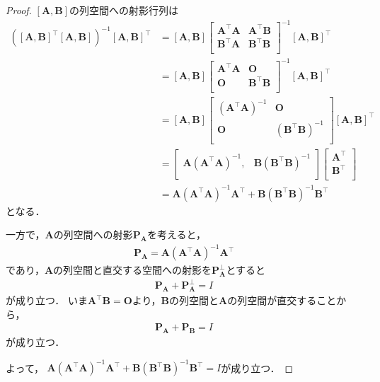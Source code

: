 \documentclass[dvipdfmx,10pt, a4j]{jarticle}
\theoremstyle{definition}
\begin{document}
\begin{proof}
$[\bm{A},\bm{B}]$の列空間への射影行列は
\begin{align*}
    [\bm{A},\bm{B}]([\bm{A},\bm{B}]^{\top}[\bm{A},\bm{B}])^{-1}[\bm{A},\bm{B}]^{\top}
    &=
    [\bm{A},\bm{B}]
    \begin{bmatrix}
        \bm{A}^{\top}\bm{A} & \bm{A}^{\top}\bm{B} \\
        \bm{B}^{\top}\bm{A} & \bm{B}^{\top}\bm{B} \\
    \end{bmatrix}^{-1}
    [\bm{A},\bm{B}]^{\top}
    \\
    &=
    [\bm{A},\bm{B}]
    \begin{bmatrix}
        \bm{A}^{\top}\bm{A} & \bm{O} \\
        \bm{O} & \bm{B}^{\top}\bm{B} \\
    \end{bmatrix}^{-1}
    [\bm{A},\bm{B}]^{\top}
    \\
    &=
    [\bm{A},\bm{B}]
    \begin{bmatrix}
        (\bm{A}^{\top}\bm{A})^{-1} & \bm{O} \\
        \bm{O} & (\bm{B}^{\top}\bm{B})^{-1} \\
    \end{bmatrix}
    [\bm{A},\bm{B}]^{\top}
    \\
    &=
    \begin{bmatrix}
        \bm{A}(\bm{A}^{\top}\bm{A})^{-1} ,&
        \bm{B}(\bm{B}^{\top}\bm{B})^{-1} \\
    \end{bmatrix}
    \begin{bmatrix}
        \bm{A}^{\top} \\
        \bm{B}^{\top} \\
    \end{bmatrix}
    \\
    &= \bm{A}(\bm{A}^{\top}\bm{A})^{-1}\bm{A}^{\top} + \bm{B}(\bm{B}^{\top}\bm{B})^{-1}\bm{B}^{\top}
\end{align*}
となる．

一方で，$\bm{A}$の列空間への射影$\bm{\bm{P}}_{\bm{A}}$を考えると，
\begin{align*}
    \bm{P}_{\bm{A}} = \bm{A}(\bm{A}^{\top}\bm{A})^{-1}\bm{A}^{\top}
\end{align*}
であり，$\bm{A}$の列空間と直交する空間への射影を$\bm{P}^{\bot}_{\bm{A}}$とすると
\begin{align*}
    \bm{P}_{\bm{A}} + \bm{P}^{\bot}_{\bm{A}} = I
\end{align*}
が成り立つ．
いま$\bm{A}^{\top}\bm{B}=\bm{O}$より，$\bm{B}$の列空間と$\bm{A}$の列空間が直交することから，
\begin{align*}
    \bm{P}_{\bm{A}} + \bm{P}_{\bm{B}} = I
\end{align*}
が成り立つ．

よって，
$\bm{A}(\bm{A}^{\top}\bm{A})^{-1}\bm{A}^{\top} + \bm{B}(\bm{B}^{\top}\bm{B})^{-1}\bm{B}^{\top} = I$が成り立つ．

\end{proof}
\end{document}
